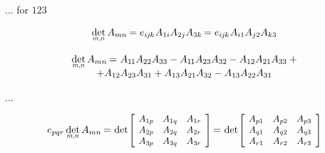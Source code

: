\begin{otherlanguage}{russian}
... for $123$

\nopagebreak\vspace{-0.2em}\begin{equation*}
\underset{\raisebox{.12em}{\scalebox{0.7}{$m$,$n$}}}{\operatorname{det}} \, A_{mn} \hspace{-0.2ex}
= e_{i\hspace{-0.1ex}j\hspace{-0.1ex}k} \hspace{.1ex} A_{1i} A_{2j} A_{3k} \hspace{-0.2ex}
= e_{i\hspace{-0.1ex}j\hspace{-0.1ex}k} \hspace{.1ex} A_{i1} A_{j2} A_{k3}
\end{equation*}

\vspace{-0.2em}\begin{multline*}
\underset{\raisebox{.12em}{\scalebox{0.7}{$m$,$n$}}}{\operatorname{det}} \, A_{mn} \hspace{-0.15ex}
= \hspace{.1ex} A_{1\hspace{-0.1ex}1} A_{22} A_{33} - A_{1\hspace{-0.1ex}1} A_{23} A_{32}
- A_{12} A_{21} A_{33} \: + \\[-0.6em]
+ A_{12} A_{23} A_{31}
+ A_{13} A_{21} A_{32} - A_{13} A_{22} A_{31}
\end{multline*}

...

\nopagebreak\vspace{-0.1em}\begin{equation*}
e_{pqr} \hspace{.4ex} \underset{\raisebox{.12em}{\scalebox{0.7}{$m$,$n$}}}{\operatorname{det}} \, A_{mn} \hspace{-0.2ex}
= \hspace{.1ex}
\operatorname{det}\hspace{-0.25ex} \scalebox{0.92}{$\left[ \hspace{-0.15ex} \begin{array}{ccc}
A_{1p} & A_{1q} & A_{1r} \\
A_{2p} & A_{2q} & A_{2r} \\
A_{3p} & A_{3q} & A_{3r}
\end{array} \hspace{-0.1ex} \right]$} \hspace{-0.2ex}
= \hspace{.1ex}
\operatorname{det}\hspace{-0.25ex} \scalebox{0.92}{$\left[ \hspace{-0.15ex} \begin{array}{ccc}
A_{p1} & A_{p2} & A_{p3} \\
A_{q1} & A_{q2} & A_{q3} \\
A_{r1} & A_{r2} & A_{r3}
\end{array} \hspace{-0.1ex} \right]$}
\end{equation*}


\end{otherlanguage}
